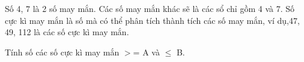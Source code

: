 Số 4, 7 là 2 số may mắn. Các số may mắn khác sẽ là các sổ chỉ gồm 4 và 7.  Số cực kì may mắn là số mà có thể phân tích thành tích các số may mắn,  ví dụ,47, 49, 112 là các số cực kì may mắn.  

   Tính số các số cực kì may mắn $>$= A và  $\le$ B.  



\